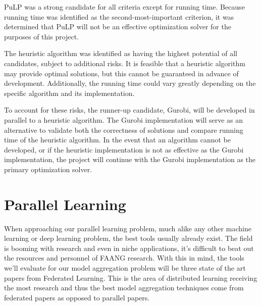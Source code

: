 \documentclass[../mthe-493-final-project.tex]{subfiles}
\begin{document}
    PuLP was a strong candidate for all criteria except for running time. Because running time was identified as the second-most-important criterion, it was determined that PuLP will not be an effective optimization solver for the purposes of this project.
    
    The heuristic algorithm was identified as having the highest potential of all candidates, subject to additional risks. It is feasible that a heuristic algorithm may provide optimal solutions, but this cannot be guaranteed in advance of development. Additionally, the running time could vary greatly depending on the specific algorithm and its implementation.
    
    To account for these risks, the runner-up candidate, Gurobi, will be developed in parallel to a heuristic algorithm. The Gurobi implementation will serve as an alternative to validate both the correctness of solutions and compare running time of the heuristic algorithm. In the event that an algorithm cannot be developed, or if the heuristic implementation is not as effective as the Gurobi implementation, the project will continue with the Gurobi implementation as the primary optimization solver.
    
    \section{Parallel Learning}
    \label{sec:parallel-learning-engineering-tools}
    When approaching our parallel learning problem, much alike any other machine learning or deep learning problem, the best tools usually already exist. The field is booming with research and even in niche applications, it’s difficult to beat out the resources and personnel of FAANG research. With this in mind, the tools we’ll evaluate for our model aggregation problem will be three state of the art papers from Federated Learning. This is the area of distributed learning receiving the most research and thus the best model aggregation techniques come from federated papers as opposed to parallel papers.
\end{document}
